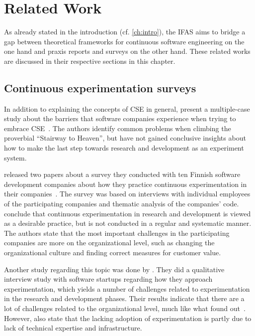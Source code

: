 %
\chapter{Related Work}
\label{ch:related-work}

As already stated in the introduction (cf. \cref{ch:intro}), the \acf{IFAS} aims to bridge a gap between theoretical frameworks for continuous software engineering on the one hand and praxis reports and surveys on the other hand.
These related works are discussed in their respective sections in this chapter.

\section{Continuous experimentation surveys}
\label{sec:related:surveys}

In addition to explaining the concepts of \acf{CSE} in general, \citeauthor{Olsson2012} present a multiple-case study about the barriers that software companies experience when trying to embrace \ac{CSE}~\cite{Olsson2012}.
The authors identify common problems when climbing the proverbial ``Stairway to Heaven'', but have not gained conclusive insights about how to make the last step towards research and development as an experiment system.

\citeauthor{Lindgren2015} released two papers about a survey they conducted with ten Finnish software development companies about how they practice continuous experimentation in their companies~\cite{Lindgren2015,lindgren2015software}.
The survey was based on interviews with individual employees of the participating companies and thematic analysis of the companies' code.
\citeauthor{Lindgren2015} conclude that continuous experimentation in research and development is viewed as a desirable practice, but is not conducted in a regular and systematic manner.
The authors state that the most important challenges in the participating companies are more on the organizational level, such as changing the organizational culture and finding correct measures for customer value.

Another study regarding this topic was done by \citet{gutbrod2017software}.
They did a qualitative interview study with software startups regarding how they approach experimentation, which yields a number of challenges related to experimentation in the research and development phases.
Their results indicate that there are a lot of challenges related to the organizational level, much like what \citeauthor{Lindgren2015} found out~\cite{Lindgren2015}.
However, \citeauthor{gutbrod2017software} also state that the lacking adoption of experimentation is partly due to lack of technical expertise and infrastructure.

